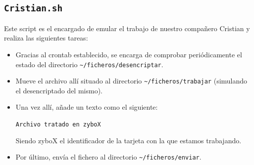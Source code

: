 \subsection{\texttt{Cristian.sh}}
Este script es el encargado de emular el trabajo de nuestro compañero Cristian y realiza las siguientes tareas:
\begin{itemize}
	\item Gracias al crontab establecido, se encarga de comprobar periódicamente el estado del directorio \texttt{\textasciitilde/ficheros/desencriptar}.
	\item Mueve el archivo allí situado al directorio \texttt{\textasciitilde/ficheros/trabajar} (simulando el desencriptado del mismo).
	\item Una vez allí, añade un texto como el siguiente:
	\begin{center}
		\texttt{Archivo tratado en zyboX}
	\end{center}	
	Siendo zyboX el identificador de la tarjeta con la que estamos trabajando.
	\item Por último, envía el fichero al directorio \texttt{\textasciitilde/ficheros/enviar}.
\end{itemize}

\newpage
